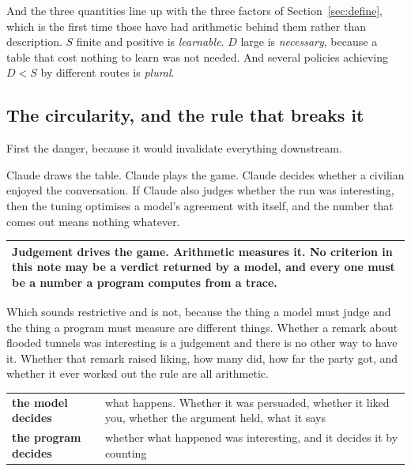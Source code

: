 \documentclass[11pt,a4paper]{article}
\begin{document}
\begin{sectionbox}
And the three quantities line up with the three factors of Section~\ref{sec:define}, which is the
first time those have had arithmetic behind them rather than description. $S$ finite and positive is
\emph{learnable}. $D$ large is \emph{necessary}, because a table that cost nothing to learn was not
needed. And several policies achieving $D < S$ by different routes is \emph{plural}.
\end{sectionbox}

\subsection{The circularity, and the rule that breaks it}

First the danger, because it would invalidate everything downstream.

Claude draws the table. Claude plays the game. Claude decides whether a civilian enjoyed the
conversation. If Claude also judges whether the run was interesting, then the tuning optimises a
model's agreement with itself, and the number that comes out means nothing whatever.

\begin{center}
\begin{tabular}{@{}>{\raggedright\arraybackslash}p{}@{}}
\toprule
\textbf{Judgement drives the game. Arithmetic measures it. No criterion in this note may be a
verdict returned by a model, and every one must be a number a program computes from a trace.} \\
\bottomrule
\end{tabular}
\end{center}

Which sounds restrictive and is not, because the thing a model must judge and the thing a program
must measure are different things. Whether a remark about flooded tunnels was interesting is a
judgement and there is no other way to have it. Whether that remark raised liking, how many did, how
far the party got, and whether it ever worked out the rule are all arithmetic.

\begin{center}
\begin{tabular}{@{}l@{\hspace{5mm}}>{\raggedright\arraybackslash}p{}@{}}
\toprule
\textbf{the model decides} & what happens. Whether it was persuaded, whether it liked you, whether
the argument held, what it says \\[1mm]
\textbf{the program decides} & whether what happened was interesting, and it decides it by counting
\\
\bottomrule
\end{tabular}
\end{center}
\end{document}
